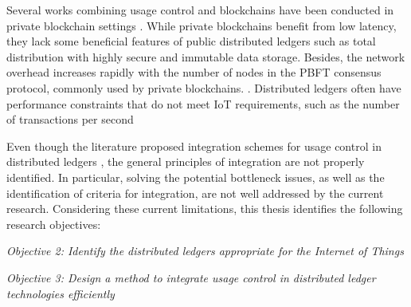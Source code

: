 Several works combining usage control and blockchains have been conducted in private blockchain settings \cite{Khan2020, Shi2021, Zhaofeng2021, Zhang2022}. While private blockchains benefit from low latency, they lack some beneficial features of public distributed ledgers such as total distribution with highly secure and immutable data storage. Besides, the network overhead increases rapidly with the number of nodes in the PBFT consensus protocol, commonly used by private blockchains.  \cite{Salimitari2020}. Distributed ledgers often have performance constraints that do not meet IoT requirements, such as the number of transactions per second \cite{Salimitari2020}  \cite{StatistaBTC2023}

 Even though the literature proposed integration schemes for usage control in distributed ledgers \cite{Khan2020, Shi2021}, the general principles of integration are not properly identified. In particular, solving the potential bottleneck issues, as well as the identification of criteria for integration, are not well addressed by the current research.
Considering these current limitations, this thesis identifies the following research objectives: 
\begin{mdframed}[ skipabove=20pt, skipbelow=20pt, innertopmargin=12pt, innerbottommargin=12pt] 
\begin{center}
     \emph{Objective 2: Identify the distributed ledgers appropriate for the Internet of Things} 
    \newline


   \emph{Objective 3: Design a method to integrate usage control in distributed ledger technologies efficiently}
   \label{obj:23}
\end{center}
\end{mdframed}
